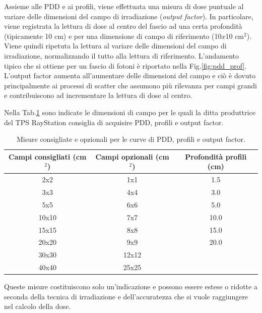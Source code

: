 Assieme alle PDD e ai profili, viene effettuata una misura di dose puntuale al variare delle dimensioni del campo di irradiazione (\textit{output factor}). In particolare, viene registrata la lettura di dose al centro del fascio ad una certa profondità (tipicamente 10 cm) e per una dimensione di campo di riferimento (10$x$10 cm$^2$). Viene quindi ripetuta la lettura al variare delle dimensioni del campo di irradiazione, normalizzando il tutto alla lettura di riferimento. L'andamento tipico che si ottiene per un fascio di fotoni è riportato nella Fig.\ref{fig:pdd_prof}. L'output factor aumenta all'aumentare delle dimensioni del campo e ciò è dovuto principalmente ai processi di scatter che assumono più rilevanza per campi grandi e contribuiscono ad incrementare la lettura di dose al centro.

Nella Tab.\ref{tab:meas} sono indicate le dimensioni di campo per le quali la ditta produttrice del TPS RayStation consiglia di acquisire PDD, profili e  output factor.
\begin{table}
\begin{tabular}{@{}ccc@{}}
\toprule
Campi consigliati (cm$^2$) & Campi opzionali (cm$^2$) & Profondità profili (cm)\\
\midrule
2x2 & 1x1 & 1.5\\
3x3 & 4x4 & 3.0\\
5x5 & 6x6 & 5.0\\
10x10 & 7x7 & 10.0\\
15x15 & 8x8 & 15.0\\
20x20 & 9x9 & 20.0\\
30x30 & 12x12 & \\
40x40 & 25x25 & \\
\bottomrule
\end{tabular}
\caption{Misure consigliate e opzionali per le curve di PDD, profili e output factor.}
\label{tab:meas}
\end{table}
Queste misure costituiscono solo un'indicazione e possono essere estese o ridotte a seconda della tecnica di irradiazione e dell'accuratezza che si vuole raggiungere nel calcolo della dose.


